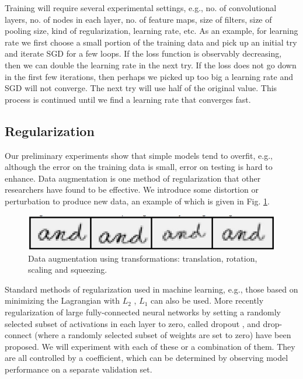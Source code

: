 \documentclass[11pt, doublespacing]{article}
\begin{document}
Training will require several experimental settings, e.g., no. of convolutional layers, no. of nodes in each layer, no. of feature maps, size of  filters, size of  pooling size, kind of regularization,  learning rate, etc.
As an example, for learning rate we first choose a small portion of the training data and pick up an initial try  and iterate SGD for a few loops. If the
loss function is observably decreasing, then we can double the learning
rate in the next try. If the loss does not go down in the first few
iterations, then perhaps we picked up too big a learning rate and
SGD will not converge. The next try will use half of the original value. This process is continued until we
find a  learning rate that converges fast.

\subsection{Regularization}
Our preliminary  experiments show that simple models tend to overfit, e.g., although the  error on the training data is small,  error on testing is hard to enhance. 
Data augmentation is one method of regularization that other researchers have found to be effective.  We introduce some distortion or perturbation to produce new data, an example of which is given in Fig. \ref{fig:augmentation}. 

\begin{figure}
\includegraphics[width=0.5\linewidth]{Figures/AugmentedData}
\caption{Data augmentation using transformations: translation, rotation, scaling and squeezing.}
\label{fig:augmentation}
\end{figure}

Standard methods of regularization used in machine learning, e.g., those based on minimizing the Lagrangian with $L_{2}$ , $L_{1}$ can also be used. More recently regularization of  large fully-connected   neural networks by setting a randomly selected subset of activations in each layer to zero, called dropout \cite{Srivastava2014} ,  and drop-connect \cite{Wan2013} (where a randomly  selected subset of weights are set to zero) have been proposed.  We will experiment with each of these or a combination of them. They are all controlled by a coefficient, which can be determined by observing model performance on a separate validation set.
\end{document}
